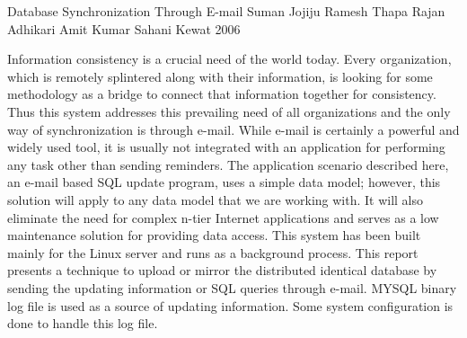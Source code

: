  \begin{conf-abstract}[]
{Database Synchronization Through E-mail}
{
Suman Jojiju
Ramesh Thapa 
Rajan Adhikari
Amit Kumar Sahani Kewat
}
{2006}

Information consistency is a crucial need of the world today. Every organization, which is remotely splintered along with their information, is looking for some methodology as a bridge to connect that information together for consistency. Thus this system addresses this prevailing need of all organizations and the only way of synchronization is through e-mail. While e-mail is certainly a powerful and widely used tool, it is usually not integrated with an application for performing any task other than sending reminders. The application scenario described here, an e-mail based SQL update program, uses a simple data model; however, this solution will apply to any data model that we are working with. It will also eliminate the need for complex n-tier Internet applications and serves as a low maintenance solution for providing data access. This system has been built mainly for the Linux server and runs as a background process. This report presents a technique to upload or mirror the distributed identical database by sending the updating information or SQL queries through e-mail. MYSQL binary log file is used as a source of updating information. Some system configuration is done to handle this log file.
  \end{conf-abstract}